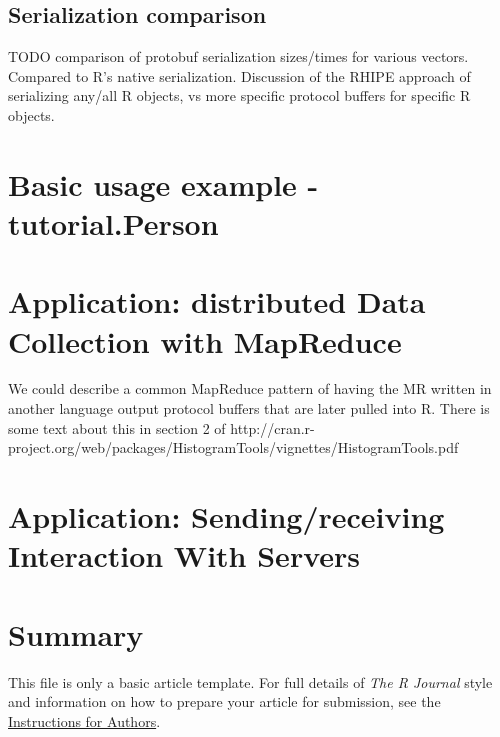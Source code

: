 \subsection{Serialization comparison}

TODO comparison of protobuf serialization sizes/times for various vectors.  Compared to R's native serialization.  Discussion of the RHIPE approach of serializing any/all R objects, vs more specific protocol buffers for specific R objects.

\section{Basic usage example - tutorial.Person}

\section{Application: distributed Data Collection with MapReduce}

We could describe a common MapReduce pattern of having the MR written
in another language output protocol buffers that are later pulled into
R.  There is some text about this in section 2 of
http://cran.r-project.org/web/packages/HistogramTools/vignettes/HistogramTools.pdf 

\section{Application: Sending/receiving Interaction With Servers}

\section{Summary}

This file is only a basic article template. For full details of \emph{The R Journal} style and information on how to prepare your article for submission, see the \href{http://journal.r-project.org/latex/RJauthorguide.pdf}{Instructions for Authors}.



\address{Dirk Eddelbuettel\\
  Debian and R Projects\\
  711 Monroe Avenue, River Forest, IL 60305\\
  USA}

\address{Author Two\\
  Affiliation\\
  Address\\
  Country}

\address{Murray Stokely\\
  Google, Inc.\\
  1600 Amphitheatre Parkway\\
  Mountain View, CA 94043\\
  USA}
